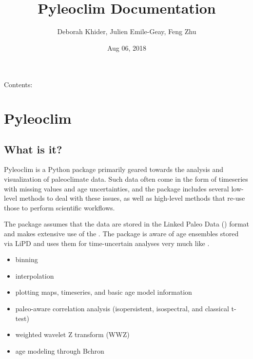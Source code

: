 \documentclass[letterpaper,10pt,english]{sphinxmanual}
\title{Pyleoclim Documentation}
\date{Aug 06, 2018}
\author{Deborah Khider, Julien Emile-Geay, Feng Zhu}
\begin{document}
\maketitle
\sphinxtableofcontents
{}\label{\detokenize{index::doc}}


Contents:


\chapter{Pyleoclim}
\label{\detokenize{Introduction:pyleoclim}}\label{\detokenize{Introduction::doc}}

\section{What is it?}
\label{\detokenize{Introduction:what-is-it}}
Pyleoclim is a Python package primarily geared towards the analysis and visualization of paleoclimate data.
Such data often come in the form of timeseries with missing values and age uncertainties, and the package
includes several low-level methods to deal with these issues, as well as high-level methods that re-use those
to perform scientific workflows.

The package assumes that the data are stored in the Linked Paleo Data ()
format and makes extensive use of the . The package
is aware of age ensembles stored via LiPD and uses them for time-uncertain analyses very much like .

\begin{itemize}
\item {} 
binning

\item {} 
interpolation

\item {} 
plotting maps, timeseries, and basic age model information

\item {} 
paleo-aware correlation analysis (isopersistent, isospectral, and classical t-test)

\item {} 
weighted wavelet Z transform (WWZ)

\item {} 
age modeling through Bchron

\end{itemize}
\end{document}
